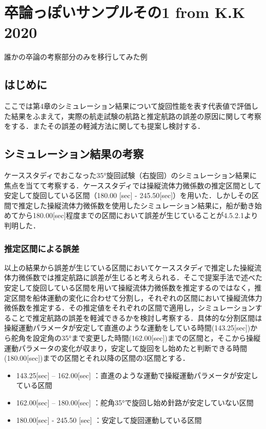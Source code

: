 \renewcommand{\prechaptername}{付録}
\renewcommand{\postchaptername}{}
\renewcommand{\thechapter}{\Alph{chapter}}

\chapter{卒論っぽいサンプルその1 from K.K 2020}

誰かの卒論の考察部分のみを移行してみた例

\section{はじめに}
ここでは第4章のシミュレーション結果について旋回性能を表す代表値で評価した結果をふまえて，実際の航走試験の航路と推定航路の誤差の原因に関して考察をする．またその誤差の軽減方法に関しても提案し検討する． 

\section{シミュレーション結果の考察}
ケーススタディでおこなった35°旋回試験（右旋回）のシミュレーション結果に焦点を当てて考察する．ケーススタディでは操縦流体力微係数の推定区間として安定して旋回している区間（180.00 [sec] - 245.50[sec]）を用いた．しかしその区間で推定した操縦流体力微係数を使用したシミュレーション結果に，船が動き始めてから180.00[sec]程度までの区間において誤差が生じていることが4.5.2.1より判明した．

\subsection{推定区間による誤差}
以上の結果から誤差が生じている区間においてケーススタディで推定した操縦流体力微係数では推定航路に誤差が生じると考えられる．そこで提案手法で述べた安定して旋回している区間を用いて操縦流体力微係数を推定するのではなく，推定区間を船体運動の変化に合わせて分割し，それぞれの区間において操縦流体力微係数を推定する．その推定値をそれぞれの区間で適用し，シミュレーションすることで推定航路の誤差を軽減できるかを検討し考察する．具体的な分割区間は操縦運動パラメータが安定して直進のような運動をしている時間(143.25[sec])から舵角を設定角の35°まで変更した時間(162.00[sec])までの区間と，そこから操縦運動パラメータの変化が収まり，安定して旋回をし始めたと判断できる時間 (180.00[sec])までの区間とそれ以降の区間の3区間とする．

\begin{itemize}
	\item 143.25[sec] – 162.00[sec] ：直進のような運動で操縦運動パラメータが安定している区間
	\item 	162.00[sec] – 180.00[sec] ：舵角35°で旋回し始め針路が安定していない区間
	\item 180.00[sec] - 245.50 [sec] ：安定して旋回運動している区間
\end{itemize}

